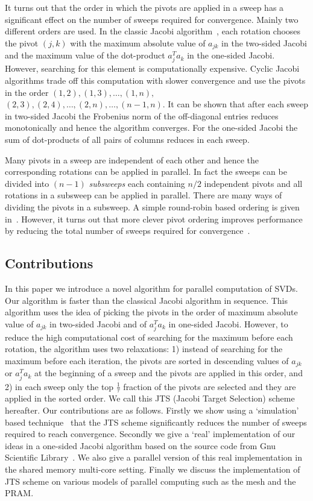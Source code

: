 \documentclass[10pt, conference, compsocconf]{IEEEtran}
\begin{document}
It turns out that the order in which the pivots are applied in a sweep has a significant effect on the number of sweeps required for convergence. Mainly two different orders are used. In the classic Jacobi algorithm~\cite{golub2012matrix}, each rotation chooses the pivot $(j,k)$ with the maximum absolute value of $a_{jk}$ in the two-sided Jacobi and the maximum value of the dot-product $a_j^{T}a_k$ in the one-sided Jacobi. However, searching for this element is computationally expensive. Cyclic Jacobi algorithms trade off this computation with slower convergence and use the pivots in the order $(1,2), (1,3), \ldots, (1,n),$ $(2,3), (2,4), \ldots, (2,n), \ldots, (n{-}1,n)$.  It can be shown that after each sweep in two-sided Jacobi the Frobenius norm of the off-diagonal entries reduces monotonically and hence the algorithm converges. For the one-sided Jacobi the sum of dot-products of all pairs of columns reduces in each sweep.

Many pivots in a sweep are independent of each other and hence the corresponding rotations can be applied in parallel. In fact the sweeps can be divided into $(n-1)$ \emph{subsweeps} each containing $n/2$ independent pivots and all rotations in a subsweep can be applied in parallel. There are many ways of dividing the pivots in a subsweep. A simple round-robin based ordering is given in~\cite{golub2012matrix}. However, it turns out that more clever pivot ordering improves performance by reducing the total number of sweeps required for convergence~\cite{bevcka2002dynamic}.

\subsection{Contributions}

In this paper we introduce a novel algorithm for parallel computation of SVDs. Our algorithm is faster than the classical Jacobi algorithm in sequence. This algorithm uses the idea of picking the pivots in the order of maximum absolute value of $a_{jk}$ in two-sided Jacobi and of $a_j^T a_k$ in one-sided Jacobi. However, to reduce the high computational cost of searching for the maximum before each rotation, the algorithm uses two relaxations: 1) instead of searching for the maximum before each iteration, the pivots are sorted in descending values of $a_{jk}$ or $a_j^T a_k$ at the beginning of a sweep and the pivots are applied in this order, and 2) in each sweep only the top $\frac{1}{\tau}$ fraction of the pivots are selected and they are applied in the sorted order. We call this JTS (Jacobi Target Selection) scheme hereafter. Our contributions are as follows. Firstly we show using a `simulation' based technique~\cite{rajasekaran2008relaxation} that the JTS scheme significantly reduces the number of sweeps required to reach convergence. Secondly we give a `real' implementation of our ideas in a one-sided Jacobi algorithm based on the source code from Gnu Scientific Library~\cite{galassi1996gnu}. We also give a parallel version of this real implementation in the shared memory multi-core setting. Finally we discuss the implementation of JTS scheme on various models of parallel computing such as the mesh and the PRAM.
 
\end{document}
